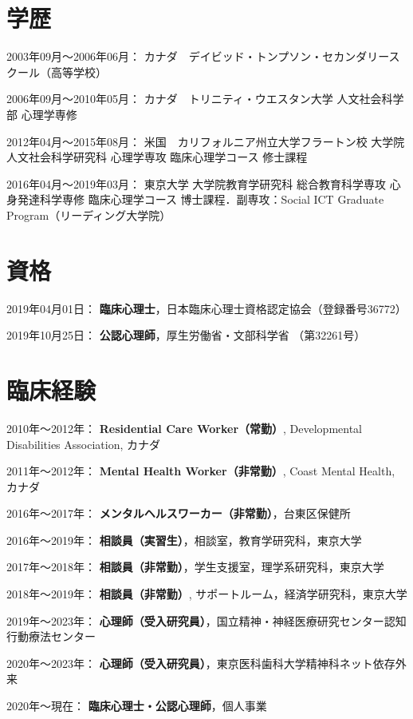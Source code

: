 \documentclass[11pt,a4paper]{article}
\begin{document}
\section{学歴}
\begin{description}
	\item 2003年09月～2006年06月： カナダ　デイビッド・トンプソン・セカンダリースクール（高等学校）
	\item 2006年09月～2010年05月： カナダ　トリニティ・ウエスタン大学 人文社会科学部 心理学専修
	\item 2012年04月～2015年08月： 米国　カリフォルニア州立大学フラートン校 大学院人文社会科学研究科 心理学専攻 臨床心理学コース 修士課程
	\item 2016年04月～2019年03月： 東京大学 大学院教育学研究科 総合教育科学専攻 心身発達科学専修 臨床心理学コース 博士課程．副専攻：Social ICT Graduate Program（リーディング大学院）
\end{description}
\section{資格}
\begin{description}
	\item 2019年04月01日： \textbf{臨床心理士}，日本臨床心理士資格認定協会（登録番号36772）
	\item 2019年10月25日： \textbf{公認心理師}，厚生労働省・文部科学省 （第32261号）
\end{description}

\section{臨床経験}
	\begin{description}
	\item 2010年〜2012年： \textbf{Residential Care Worker（常勤）}, Developmental Disabilities Association, カナダ
	\item 2011年〜2012年： \textbf{Mental Health Worker（非常勤）}, Coast Mental Health, カナダ
	\item 2016年〜2017年： \textbf{メンタルヘルスワーカー（非常勤）}，台東区保健所
	\item 2016年〜2019年： \textbf{相談員（実習生）}，相談室，教育学研究科，東京大学
	\item 2017年〜2018年： \textbf{相談員（非常勤）}，学生支援室，理学系研究科，東京大学
	\item 2018年〜2019年： \textbf{相談員（非常勤）}, サポートルーム，経済学研究科，東京大学
	\item 2019年〜2023年： \textbf{心理師（受入研究員）}，国立精神・神経医療研究センター認知行動療法センター
	\item 2020年〜2023年： \textbf{心理師（受入研究員）}，東京医科歯科大学精神科ネット依存外来
	\item 2020年〜現在： \textbf{臨床心理士・公認心理師}，個人事業
	\end{description}
\end{document}
